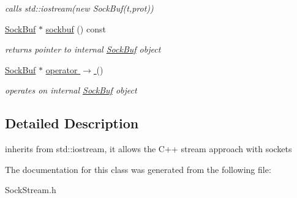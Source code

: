 \begin{CompactItemize}
\begin{CompactList}\small\item\em calls std::iostream(new SockBuf(t,prot)) \item\end{CompactList}\item 
\hypertarget{classsocketpp_1_1SockStream_4b14a0ce8d640deb5f5bd64807c7b68d}{
\hyperlink{classsocketpp_1_1SockBuf}{SockBuf} $\ast$ \hyperlink{classsocketpp_1_1SockStream_4b14a0ce8d640deb5f5bd64807c7b68d}{sockbuf} () const }
\label{classsocketpp_1_1SockStream_4b14a0ce8d640deb5f5bd64807c7b68d}

\begin{CompactList}\small\item\em returns pointer to internal \hyperlink{classsocketpp_1_1SockBuf}{SockBuf} object \item\end{CompactList}\item 
\hypertarget{classsocketpp_1_1SockStream_c5509fd039943c07c4506e42c75605e3}{
\hyperlink{classsocketpp_1_1SockBuf}{SockBuf} $\ast$ \hyperlink{classsocketpp_1_1SockStream_c5509fd039943c07c4506e42c75605e3}{operator $\rightarrow$ } ()}
\label{classsocketpp_1_1SockStream_c5509fd039943c07c4506e42c75605e3}

\begin{CompactList}\small\item\em operates on internal \hyperlink{classsocketpp_1_1SockBuf}{SockBuf} object \item\end{CompactList}\end{CompactItemize}


\subsection{Detailed Description}
inherits from std::iostream, it allows the C++ stream approach with sockets 

The documentation for this class was generated from the following file:\begin{CompactItemize}
\item 
SockStream.h\end{CompactItemize}
